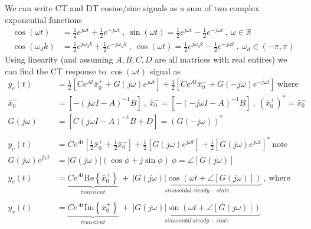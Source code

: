 \documentclass[twoside]{article}
\begin{document}
We can write CT and DT cosine/sine signals as a sum of two complex exponential functions
%
\begin{align*} 
 	\cos(\omega t) &= \frac{1}{2} e^{j \omega t} + \frac{1}{2} e^{-j \omega t} \ , \ \sin(\omega t) = \frac{1}{2} e^{j \omega t} - \frac{1}{2} e^{-j \omega t} \ , \ \omega \in \mathbb{R} 
	\\
	\cos(\omega_d k) &= \frac{1}{2} e^{j \omega_d k} + \frac{1}{2} e^{-j \omega_d k} \ , \ 	\cos(\omega t) = \frac{1}{2} e^{j \omega_d k} - \frac{1}{2} e^{-j \omega t} \ , \ \omega_d \in \left( -\pi , \pi \right) 
\end{align*}
%
Using linearity (and assuming $A, B, C, D$ are all matrices with real entires) we can find the CT response to $\cos(\omega t)$ signal as
%
\begin{align*}
   y_c(t) &= \frac{1}{2} \left[ C e^{A t} \bar{x}_0^+ + G(j \omega) e^{j \omega t} \right] + \frac{1}{2} \left[ C e^{A t} \bar{x}_0^- + G(-j \omega) e^{-j \omega t} \right] \ \mathrm{where} \ 
   \\
   \bar{x}_0^+ &= \left[ - (j \omega I - A)^{-1} B \right]  \ , \ \bar{x}_0^- = \left[ - (-j \omega I - A)^{-1} B \right] \ , \ \left( \bar{x}_0^+ \right)^* = \bar{x}_0^- 
   \\
   G(j \omega) &= \left[ C (j \omega I - A)^{-1} B + D \right] = \left( G(-j \omega) \right)^*
   \\
   \\
   y_c(t) &= C e^{A t} \left[ \frac{1}{2} \bar{x}_0^+ + \frac{1}{2} \bar{x}_0^- \right] +
   \frac{1}{2} \left[ G(j \omega) e^{j \omega t} \right] + \frac{1}{2} \left[ G(j \omega) e^{j \omega t} \right]^* \ \mathrm{note} 
   \\
   G(j \omega) e^{j \omega t} &= |G(j \omega)| \left( \cos \phi + j \sin \phi \right) \ \phi = \angle [G(j \omega)]
   \\
   \\
   y_c(t) &=  \underbrace{C e^{A t} \mathrm{Re}\left\lbrace \bar{x}_0^+ \right\rbrace}_{transient}  \ +  \  \underbrace{| G(j \omega) | \cos \left( \omega t + \angle [G(j \omega)] \right)}_{sinusoidal \ steady-state} \ , \ \mathrm{where}
   \\
   \\
   y_s(t) &=  \underbrace{C e^{A t} \mathrm{Im}\left\lbrace \bar{x}_0^+ \right\rbrace}_{transient}  \ +  \  \underbrace{| G(j \omega) | \sin \left( \omega t + \angle [G(j \omega)] \right)}_{sinusoidal \ steady-state}
\end{align*}
\end{document}
